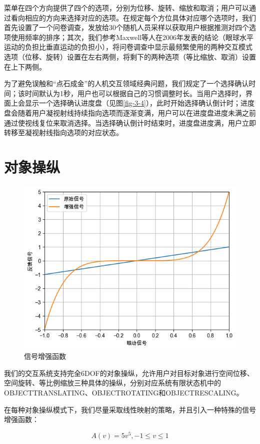 菜单在四个方向提供了四个的选项，分别为位移、旋转、缩放和取消；用户可以通过看向相应的方向来选择对应的选项。在规定每个方位具体对应哪个选项时，我们首先设置了一个问卷调查，发放给30个随机人员采样以获取用户根据推测对四个选项使用频率的排序；其次，我们参考Maxwell等人在2006年发表的结论（眼球水平运动的负担比垂直运动的负担小），将问卷调查中显示最频繁使用的两种交互模式选项（位移、旋转）设置在左右两侧，将剩下的两种选项（等比缩放、取消）设置在上下两侧。

为了避免误触和“点石成金”的人机交互领域经典问题，我们规定了一个选择确认时间；该时间默认为1秒，用户也可以根据自己的习惯调整时长。当用户选择时，界面上会显示一个选择确认进度盘（见图\ref{fig-3-4}），此时开始选择确认倒计时；进度盘会随着用户凝视射线持续指向选项而逐渐变满，用户可以在进度盘进度未满之前通过使视线复位来取消选择。当选择确认倒计时结束时，进度盘进度满，用户立即转移至凝视射线指向选项的对应状态。

\section{对象操纵}
\label{Manipulation}

\begin{figure}[t!]
    \centering
    \includegraphics[width=.7\textwidth]{figure/augmented.png}
    \caption{信号增强函数}
    \label{fig-3-2}
\end{figure}

我们的交互系统支持完全6DOF的对象操纵，允许用户对目标对象进行空间位移、空间旋转、等比例缩放三种具体的操纵，分别对应系统有限状态机中的OBJECT\us TRANSLATING、OBJECT\us ROTATING和OBJECT\us RESCALING。

在每种对象操纵模式下，我们尽量采取线性映射的策略，并且引入一种特殊的信号增强函数：

\begin{equation}
	\label{formula-3-1}
	A(v) = 5v^{5}, -1 \le v \le 1
\end{equation}

